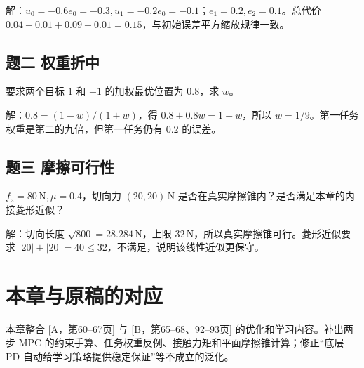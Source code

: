 解：$u_0=-0.6e_0=-0.3,u_1=-0.2e_0=-0.1$；$e_1=0.2,e_2=0.1$。总代价 $0.04+0.01+0.09+0.01=0.15$，与初始误差平方缩放规律一致。

\subsection*{题二 权重折中}
要求两个目标 $1$ 和 $-1$ 的加权最优位置为 $0.8$，求 $w$。

解：$0.8=(1-w)/(1+w)$，得 $0.8+0.8w=1-w$，所以 $w=1/9$。第一任务权重是第二的九倍，但第一任务仍有 $0.2$ 的误差。

\subsection*{题三 摩擦可行性}
$f_z=80\,\mathrm N,\mu=0.4$，切向力 $(20,20)\,\mathrm N$ 是否在真实摩擦锥内？是否满足本章的内接菱形近似？

解：切向长度 $\sqrt{800}=28.284\,\mathrm N$，上限 $32\,\mathrm N$，所以真实摩擦锥可行。菱形近似要求 $|20|+|20|=40\le32$，不满足，说明该线性近似更保守。

\section*{本章与原稿的对应}
本章整合 [A，第60--67页] 与 [B，第65--68、92--93页] 的优化和学习内容。补出两步 MPC 的约束手算、任务权重反例、接触力矩和平面摩擦锥计算；修正“底层 PD 自动给学习策略提供稳定保证”等不成立的泛化。
